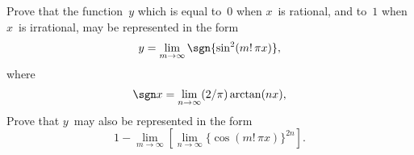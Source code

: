  Prove that the function~$y$ which is equal to~$0$ when $x$~is rational, and
to~$1$ when $x$~is irrational, may be represented in the form
\[
y = \lim_{m \to \infty} \sgn\{\sin^{2}(m!\, \pi x)\},
\]
where
\[
\sgn x = \lim_{n \to \infty} (2/\pi)\arctan(nx),
\]
Prove that $y$~may also be represented in the form
\[
1 - \lim_{m \to\infty} [\lim_{n \to\infty}\{\cos(m!\, \pi x)\}^{2n}].
\]
